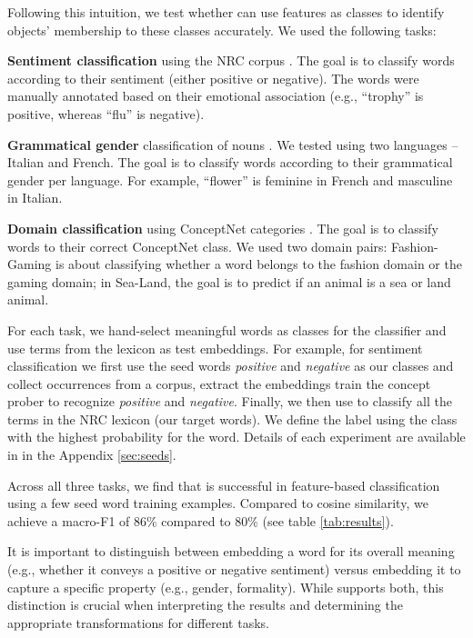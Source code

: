 Following this intuition, we test whether \wc can use features as classes to identify objects' membership to these classes accurately. We used the following tasks: 

\noindent \textbf{Sentiment classification} using the NRC corpus \cite{pang-etal-2002-thumbs, mohammad-etal-2013-nrc}. The goal is to classify words according to their sentiment (either positive or negative). The words were manually annotated based on their emotional association (e.g., ``trophy'' is positive, whereas ``flu'' is negative).

\noindent \textbf{Grammatical gender} classification of nouns \cite{sahai-sharma-2021-predicting}. We tested \wc using two languages -- Italian and French. The goal is to classify words according to their grammatical gender per language. For example, ``flower'' is feminine in French and masculine in Italian. 

\noindent \textbf{Domain classification} using ConceptNet categories \cite{dalvi2022discovering}. The goal is to classify words to their correct ConceptNet class. We used two domain pairs: Fashion-Gaming is about classifying whether a word belongs to the fashion domain or the gaming domain; in Sea-Land, the goal is to predict if an animal is a sea or land animal.

For each task, we hand-select meaningful words as classes for the classifier and use terms from the lexicon as test embeddings. For example, for sentiment classification we first use the seed words \textit{positive} and \textit{negative} as our classes and collect occurrences from a corpus, extract the embeddings train the concept prober to recognize \textit{positive} and \textit{negative}. Finally, we then use \wc to classify all the terms in the NRC lexicon (our target words). We define the label using the class with the highest probability for the word. Details of each experiment are available in in the Appendix \ref{sec:seeds}.

Across all three tasks, we find that \wc is successful in feature-based classification using a few seed word training examples. Compared to cosine similarity, we achieve a macro-F1 of 86\% compared to 80\% (see table \ref{tab:results}). 

It is important to distinguish between embedding a word for its overall meaning (e.g., whether it conveys a positive or negative sentiment) versus embedding it to capture a specific property (e.g., gender, formality). While \wc supports both, this distinction is crucial when interpreting the results and determining the appropriate transformations for different tasks.


